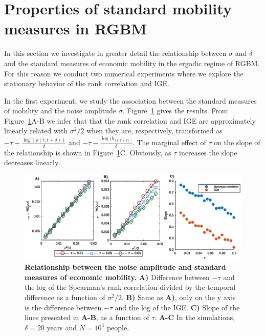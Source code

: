 \documentclass[11pt]{article}
\newcommand{\Fref}[1]{Figure~\ref{fig:#1}}
\numberwithin{equation}{section}
\begin{document}
\section{Properties of standard mobility measures in RGBM}\label{sec:properties-standard-mobility-measures}

In this section we investigate in greater detail the relationship between $\sigma$ and $\delta$ and the standard measures of economic mobility in the ergodic regime of RGBM. For this reason we conduct two numerical experiments where we explore the stationary behavior of the rank correlation and IGE. 

In the first experiment, we study the association between the standard measures of mobility and the noise amplitude $\sigma$. \Fref{rgbm-standard-measures-sigma} gives the results. From \Fref{rgbm-standard-measures-sigma}A-B we infer that that the rank correlation and IGE are approximately linearly related with $\sigma^2/2$ when they are, respectively, transformed as $-\tau - \frac{\log(\rho(t,t+\delta))}{\delta}$ and $-\tau - \frac{\log(b_{(t,t+\delta))}}{\delta}$. The marginal effect of $\tau$ on the slope of the relationship is shown in \Fref{rgbm-standard-measures-sigma}C. Obviously, as $\tau$ increases the slope decreases linearly.

\begin{figure}[!htb]
\centering
\includegraphics[width=1.0\textwidth]{figs/fig_rgbm_sigma_relationship.eps}
\caption{\textbf{Relationship between the noise amplitude and standard measures of economic mobility.} \textbf{A)} Difference between $-\tau$ and the log of the Spearman's rank correlation divided by the temporal difference as a function of $\sigma^2/2$. \textbf{B)} Same as \textbf{A)}, only on the y axis is the difference between $-\tau$ and the log of the IGE. \textbf{C)} Slope of the lines presented in \textbf{A-B}, as a function of $\tau$. 
\textbf{A-C} In the simulations, $\delta = 20$ years and $N = 10^4$ people.
\label{fig:rgbm-standard-measures-sigma}}
\end{figure}
\FloatBarrier
\end{document}

